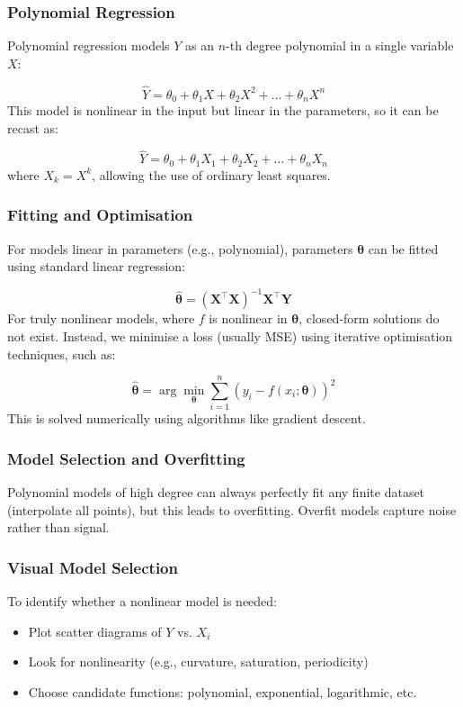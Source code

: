 \documentclass[9pt]{extarticle}
\begin{document}
\subsubsection*{Polynomial Regression}

Polynomial regression models $Y$ as an $n$-th degree polynomial in a single variable $X$:

\[
\hat{Y} = \theta_0 + \theta_1 X + \theta_2 X^2 + \dots + \theta_n X^n
\]
This model is nonlinear in the input but linear in the parameters, so it can be recast as:

\[
\hat{Y} = \theta_0 + \theta_1 X_1 + \theta_2 X_2 + \dots + \theta_n X_n
\]
where $X_k = X^k$, allowing the use of ordinary least squares.

\subsubsection*{Fitting and Optimisation}

For models linear in parameters (e.g., polynomial), parameters $\boldsymbol{\theta}$ can be fitted using standard linear regression:

\[
\boldsymbol{\hat{\theta}} = (\mathbf{X}^\top \mathbf{X})^{-1} \mathbf{X}^\top \mathbf{Y}
\]
For truly nonlinear models, where $f$ is nonlinear in $\boldsymbol{\theta}$, closed-form solutions do not exist. Instead, we minimise a loss (usually MSE) using iterative optimisation techniques, such as:

\[
\boldsymbol{\hat{\theta}} = \arg\min_{\boldsymbol{\theta}} \sum_{i=1}^n (y_i - f(x_i; \boldsymbol{\theta}))^2
\]
This is solved numerically using algorithms like gradient descent.

\subsubsection*{Model Selection and Overfitting}

Polynomial models of high degree can always perfectly fit any 
finite dataset (interpolate all points), but this leads to overfitting. 
Overfit models capture noise rather than signal.

\subsubsection*{Visual Model Selection}

To identify whether a nonlinear model is needed:
\begin{itemize}
    \item Plot scatter diagrams of $Y$ vs. $X_i$
    \item Look for nonlinearity (e.g., curvature, saturation, periodicity)
    \item Choose candidate functions: polynomial, exponential, logarithmic, etc.
\end{itemize}
\end{document}

